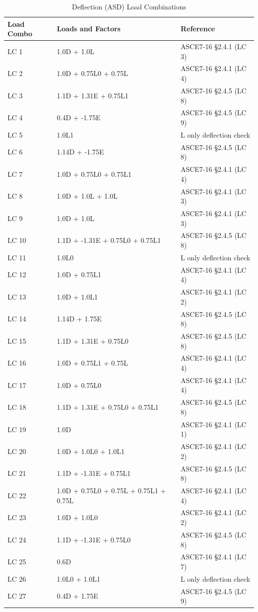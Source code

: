 \documentclass[12pt, fleqn]{article}
\begin{document}
\begin{table}[H]
\caption{Deflection (ASD) Load Combinations}
\centering
\begin{tabular}{l l l}
\hline
Load Combo & Loads and Factors & Reference\\
\hline
LC 1 & 1.0D + 1.0L\textsubscriptr1 & ASCE7-16 \S2.4.1 (LC 3)\\
LC 2 & 1.0D + 0.75L0 + 0.75L\textsubscriptr0 & ASCE7-16 \S2.4.1 (LC 4)\\
LC 3 & 1.1D + 1.31E + 0.75L1 & ASCE7-16 \S2.4.5 (LC 8)\\
LC 4 & 0.4D + -1.75E & ASCE7-16 \S2.4.5 (LC 9)\\
LC 5 & 1.0L1 & L only deflection check\\
LC 6 & 1.14D + -1.75E & ASCE7-16 \S2.4.5 (LC 8)\\
LC 7 & 1.0D + 0.75L0 + 0.75L1 & ASCE7-16 \S2.4.1 (LC 4)\\
LC 8 & 1.0D + 1.0L\textsubscriptr0 + 1.0L\textsubscriptr1 & ASCE7-16 \S2.4.1 (LC 3)\\
LC 9 & 1.0D + 1.0L\textsubscriptr0 & ASCE7-16 \S2.4.1 (LC 3)\\
LC 10 & 1.1D + -1.31E + 0.75L0 + 0.75L1 & ASCE7-16 \S2.4.5 (LC 8)\\
LC 11 & 1.0L0 & L only deflection check\\
LC 12 & 1.0D + 0.75L1 & ASCE7-16 \S2.4.1 (LC 4)\\
LC 13 & 1.0D + 1.0L1 & ASCE7-16 \S2.4.1 (LC 2)\\
LC 14 & 1.14D + 1.75E & ASCE7-16 \S2.4.5 (LC 8)\\
LC 15 & 1.1D + 1.31E + 0.75L0 & ASCE7-16 \S2.4.5 (LC 8)\\
LC 16 & 1.0D + 0.75L1 + 0.75L\textsubscriptr1 & ASCE7-16 \S2.4.1 (LC 4)\\
LC 17 & 1.0D + 0.75L0 & ASCE7-16 \S2.4.1 (LC 4)\\
LC 18 & 1.1D + 1.31E + 0.75L0 + 0.75L1 & ASCE7-16 \S2.4.5 (LC 8)\\
LC 19 & 1.0D & ASCE7-16 \S2.4.1 (LC 1)\\
LC 20 & 1.0D + 1.0L0 + 1.0L1 & ASCE7-16 \S2.4.1 (LC 2)\\
LC 21 & 1.1D + -1.31E + 0.75L1 & ASCE7-16 \S2.4.5 (LC 8)\\
LC 22 & 1.0D + 0.75L0 + 0.75L\textsubscriptr0 + 0.75L1 + 0.75L\textsubscriptr1 & ASCE7-16 \S2.4.1 (LC 4)\\
LC 23 & 1.0D + 1.0L0 & ASCE7-16 \S2.4.1 (LC 2)\\
LC 24 & 1.1D + -1.31E + 0.75L0 & ASCE7-16 \S2.4.5 (LC 8)\\
LC 25 & 0.6D & ASCE7-16 \S2.4.1 (LC 7)\\
LC 26 & 1.0L0 + 1.0L1 & L only deflection check\\
LC 27 & 0.4D + 1.75E & ASCE7-16 \S2.4.5 (LC 9)\\
\hline
\end{tabular}
\end{table}
\end{document}
